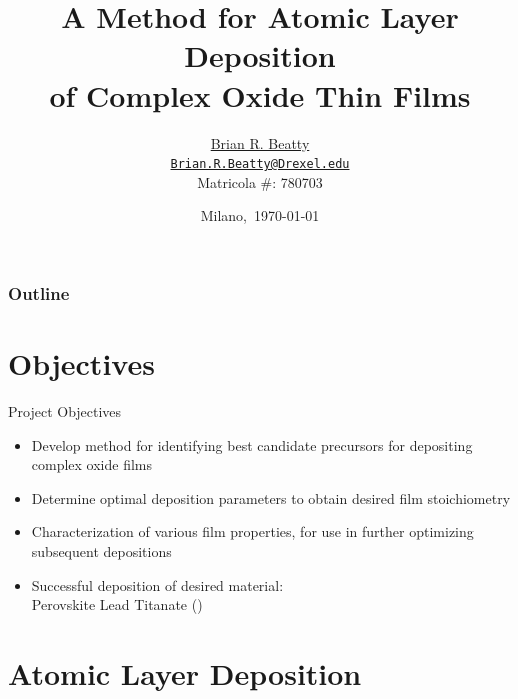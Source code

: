 \documentclass[professionalfont]{beamer}
\title[ALD of Complex Oxides]%
{A Method for Atomic Layer Deposition\\
of Complex Oxide Thin Films}
\author[B. R. Beatty]{\underline{Brian R. Beatty}\\
{\small \vspace{0.3em} \href{mailto:Brian.R.Beatty@Drexel.edu}{\nolinkurl{Brian.R.Beatty@Drexel.edu}}\\%
	Matricola \#: 780703}}
\date[Milano,\ddmmyyyydate \today]{Milano,\longdate\ \today}
\institute[PoliMi]{Politecnico di Milano}
\begin{document}
\begin{frame}
\titlepage
\end{frame}

\begin{frame}
\frametitle{Outline}
\Large
\tableofcontents
\end{frame}


\section{Objectives}

\begin{frame}{Project Objectives}

\begin{itemize}
	\item Develop method for identifying best candidate precursors for depositing complex oxide films
	\vspace{1.5em}
	\item Determine optimal deposition parameters to obtain desired film stoichiometry
	\vspace{1.5em}
	\item Characterization of various film properties, for use in further optimizing subsequent depositions
	\vspace{1.5em}
	\item Successful deposition of desired material: \\Perovskite Lead Titanate ()
\end{itemize}

\end{frame}


\section{Atomic Layer Deposition}

\end{document}

